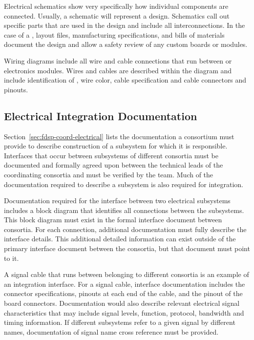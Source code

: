Electrical schematics show very specifically how individual
components are connected.  Usually, a schematic will represent a
 design.  Schematics call out specific
parts that are used in the design and include all interconnections.
In the case of a , layout files, manufacturing
specifications, and bills of materials document
the design and allow a safety review of any custom boards or
modules.


Wiring diagrams include all wire and cable connections that run
between  or electronics modules.  Wires and
cables are described within the diagram and include identification of
, wire color, cable specification and
cable connectors and pinouts.





\subsection{Electrical Integration Documentation}
\label{sec:fdsp-coord-integ-electrical}

Section~\ref{sec:fdsp-coord-electrical} lists the documentation a consortium must provide
to describe construction of a subsystem for which it is responsible. Interfaces that occur
between subsystems of different consortia must be documented and formally agreed
upon between the technical leads of the coordinating consortia and
must be verified by the  team.  Much of the
documentation required to describe a subsystem is also required for
integration. 


Documentation required for the interface between two electrical
subsystems includes a block diagram that identifies all connections
between the subsystems.  This block diagram must exist in the formal
interface document between consortia.  For each connection, additional
documentation must fully describe the interface
details. This additional detailed information can exist outside of the
primary interface document between the consortia, but that document must point to it. %


A signal cable that runs
between  belonging to different consortia is an example of an 
integration interface.  For
a signal cable, interface documentation includes the connector
specifications, pinouts at each end of the cable, and the pinout of the
board connectors.  Documentation would also describe 
relevant electrical signal characteristics that may include signal
levels, function, protocol, bandwidth and timing information.  If
different subsystems refer to a given signal by different names, 
documentation of signal name cross reference must be
provided.

